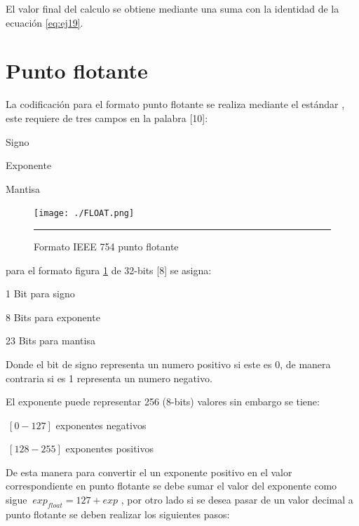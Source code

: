 El valor final del calculo se obtiene mediante una suma con la identidad de la ecuación \ref{eq:ej19}. 

\section{Punto flotante}

La codificación para el formato punto flotante se realiza mediante el estándar , este requiere de tres campos en la palabra [10]: 

\begin{compactitem}
\item Signo 
\item Exponente
\item Mantisa 
\end{compactitem}

\begin{figure}[H]
  \centering
    \texttt{[image: ./FLOAT.png]}
    \rule{35em}{0.5pt}
  \caption[Formato IEEE 754 punto flotante]{Formato IEEE 754 punto flotante}
  \label{fig:FLOAT}
\end{figure}

para el formato  figura \ref{fig:FLOAT} de 32-bits [8] se asigna: 

\begin{compactitem}
\item 1 Bit para signo 
\item 8 Bits para exponente
\item 23 Bits para mantisa 
\end{compactitem}

Donde el bit de signo representa un numero positivo si este es 0, de manera contraria si es 1 representa un numero negativo. 

El exponente puede representar 256 (8-bits) valores sin embargo se tiene:

\begin{compactitem}
\item $\ \left[0-127\right]$ exponentes negativos  
\item $\ \left[128-255\right]$ exponentes positivos
\end{compactitem}

De esta manera para convertir el un exponente positivo en el valor correspondiente en punto flotante se debe sumar el valor del exponente como sigue $\ exp_{float}=127+exp $ , por otro lado si se desea pasar de un valor decimal a punto flotante se deben realizar los siguientes pasos: 

